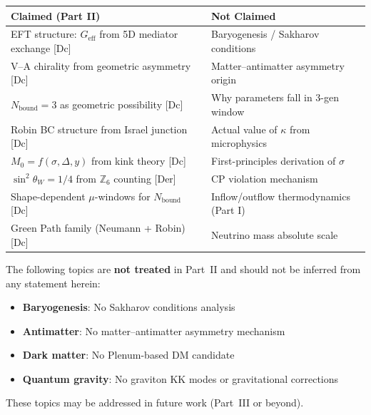 \begin{center}
\renewcommand{\arraystretch}{1.4}
\scriptsize
\begin{tabular}{@{}p{5cm}|p{5cm}@{}}
\toprule
\textbf{Claimed (Part II)} & \textbf{Not Claimed} \\
\midrule
EFT structure: $G_{\text{eff}}$ from 5D mediator exchange [Dc] &
Baryogenesis / Sakharov conditions \\[4pt]

V--A chirality from geometric asymmetry [Dc] &
Matter--antimatter asymmetry origin \\[4pt]

$N_{\text{bound}} = 3$ as geometric possibility [Dc] &
Why parameters fall in 3-gen window \\[4pt]

Robin BC structure from Israel junction [Dc] &
Actual value of $\kappa$ from microphysics \\[4pt]

$M_0 = f(\sigma, \Delta, y)$ from kink theory [Dc] &
First-principles derivation of $\sigma$ \\[4pt]

$\sin^2\theta_W = 1/4$ from $\mathbb{Z}_6$ counting [Der] &
CP violation mechanism \\[4pt]

Shape-dependent $\mu$-windows for $N_{\text{bound}}$ [Dc] &
Inflow/outflow thermodynamics (Part I) \\[4pt]

Green Path family (Neumann + Robin) [Dc] &
Neutrino mass absolute scale \\
\bottomrule
\end{tabular}
\end{center}

\begin{tcolorbox}[colback=gray!5!white, colframe=gray!50!black,
    title=\textbf{Explicit Non-Treatment Notice}]
The following topics are \textbf{not treated} in Part~II and should not be inferred from any statement herein:
\begin{itemize}[nosep]
    \item \textbf{Baryogenesis}: No Sakharov conditions analysis
    \item \textbf{Antimatter}: No matter--antimatter asymmetry mechanism
    \item \textbf{Dark matter}: No Plenum-based DM candidate
    \item \textbf{Quantum gravity}: No graviton KK modes or gravitational corrections
\end{itemize}
These topics may be addressed in future work (Part~III or beyond).
\end{tcolorbox}

